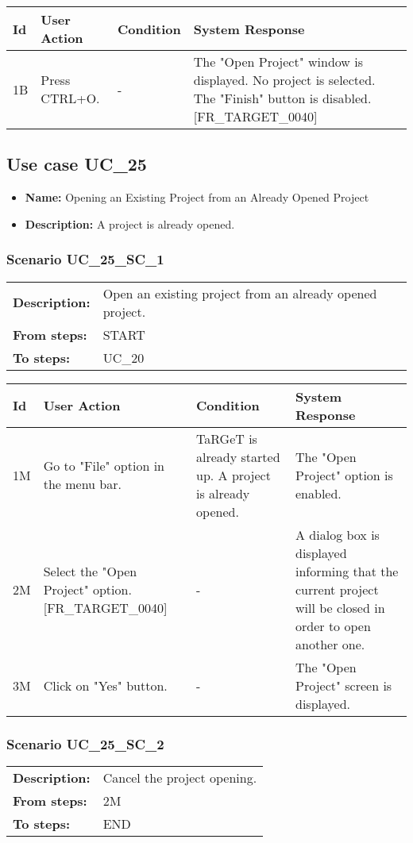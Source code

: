 \documentclass[a4paper,11pt]{article}
\newcommand{\bl}{\\ \hline}
\begin{document}
\begin{tabular}{|p{0.8in}|p{1.6in}|p{1.6in}|p{1.6in}|}
\hline
Id & User Action & Condition & System Response  \bl 
1B & Press CTRL+O. & - & The "Open Project" window is displayed. No project is selected. The "Finish" button is disabled. [FR_TARGET_0040] \bl 
\end{tabular}
\subsection*{Use case UC_25}
\begin{itemize}
\item {\bf Name: }Opening an Existing Project from an Already Opened Project
\item {\bf Description: }A project is already opened.
\end{itemize}
\subsubsection*{Scenario UC_25_SC_1}
\begin{tabular}{p{1in}p{4in}}
{\bf Description:} & Open an existing project from an already opened project. \\
{\bf From steps:} & START \\
{\bf To steps:} & UC_20#3M \\
\end{tabular}
 
\begin{tabular}{|p{0.8in}|p{1.6in}|p{1.6in}|p{1.6in}|}
\hline
Id & User Action & Condition & System Response  \bl 
1M & Go to "File" option in the menu bar. & TaRGeT is already started up. A project is already opened. & The "Open Project" option is enabled. \bl 
2M & Select the "Open Project" option. [FR_TARGET_0040] & - & A dialog box is displayed informing that the current project will be closed in order to open another one. \bl 
3M & Click on "Yes" button. & - & The "Open Project" screen is displayed. \bl 
\end{tabular}
\subsubsection*{Scenario UC_25_SC_2}
\begin{tabular}{p{1in}p{4in}}
{\bf Description:} & Cancel the project opening. \\
{\bf From steps:} & 2M \\
{\bf To steps:} & END \\
\end{tabular}
 
\end{document}
